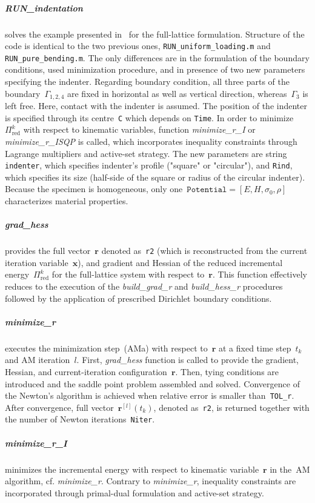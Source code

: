 \documentclass[preprint,12pt,authoryear]{elsarticle}
\newcommand{\bs}[1]{{\boldsymbol{#1}}}
\begin{document}
\subparagraph{RUN\_indentation} solves the example presented in~\cite[Section~5.3]{RokosQC} for the full-lattice formulation. Structure of the code is identical to the two previous ones, \texttt{RUN\_uniform\_loading.m} and \texttt{RUN\_pure\_bending.m}. The only differences are in the formulation of the boundary conditions, used minimization procedure, and in presence of two new parameters specifying the indenter. Regarding boundary condition, all three parts of the boundary~$\Gamma_{1,2,4}$ are fixed in horizontal as well as vertical direction, whereas~$\Gamma_3$ is left free. Here, contact with the indenter is assumed. The position of the indenter is specified through its centre~\texttt{C} which depends on \texttt{Time}. In order to minimize~$\Pi^k_\mathrm{red}$ with respect to kinematic variables, function \emph{minimize\_r\_I} or \emph{minimize\_r\_ISQP} is called, which incorporates inequality constraints through Lagrange multipliers and active-set strategy. The new parameters are string \texttt{indenter}, which specifies indenter's profile ("square" or "circular"), and \texttt{Rind}, which specifies its size (half-side of the square or radius of the circular indenter). Because the specimen is homogeneous, only one~$\texttt{Potential}=[E,H,\sigma_{0},\rho]$ characterizes material properties.
%
%
\subparagraph{grad\_hess} provides the full vector~$\bs{r}$ denoted as~\texttt{r2} (which is reconstructed from the current iteration variable~$\bs{x}$), and gradient and Hessian of the reduced incremental energy~$\Pi^k_\mathrm{red}$ for the full-lattice system with respect to~$\bs{r}$. This function effectively reduces to the execution of the \emph{build\_grad\_r} and \emph{build\_hess\_r} procedures followed by the application of prescribed Dirichlet boundary conditions.
%
%
\subparagraph{minimize\_r} executes the minimization step~(AMa) with respect to~$\bs{r}$ at a fixed time step~$t_k$ and AM iteration~$l$. First, \emph{grad\_hess} function is called to provide the gradient, Hessian, and current-iteration configuration~$\bs{r}$. Then, tying conditions are introduced and the saddle point problem assembled and solved. Convergence of the Newton's algorithm is achieved when relative error is smaller than~\texttt{TOL\_r}. After convergence, full vector~$\bs{r}^{[l]}(t_k)$, denoted as~\texttt{r2}, is returned together with the number of Newton iterations~\texttt{Niter}.
%
%
\subparagraph{minimize\_r\_I} minimizes the incremental energy with respect to kinematic variable~$\bs{r}$ in the~AM algorithm, cf. \emph{minimize\_r}. Contrary to \emph{minimize\_r}, inequality constraints are incorporated through primal-dual formulation and active-set strategy. 
\end{document}
